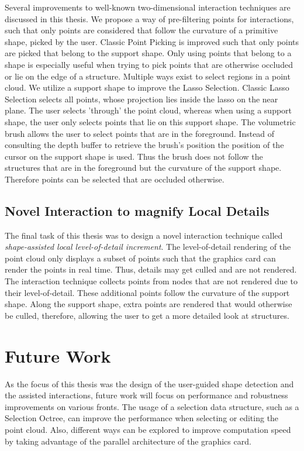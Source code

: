 Several improvements to well-known two-dimensional interaction techniques are discussed in this thesis. We propose a way of pre-filtering points for interactions, such that only points are considered that follow the curvature of a primitive shape, picked by the user. Classic Point Picking is improved such that only points are picked that belong to the support shape. Only using points that belong to a shape is especially useful when trying to pick points that are otherwise occluded or lie on the edge of a structure. Multiple ways exist to select regions in a point cloud. We utilize a support shape to improve the Lasso Selection. Classic Lasso Selection selects all points, whose projection lies inside the lasso on the near plane. The user selects 'through' the point cloud, whereas when using a support shape, the user only selects points that lie on this support shape. The volumetric brush allows the user to select points that are in the foreground. Instead of consulting the depth buffer to retrieve the brush's position the position of the cursor on the support shape is used. Thus the brush does not follow the structures that are in the foreground but the curvature of the support shape. Therefore points can be selected that are occluded otherwise. 


\subsection*{Novel Interaction to magnify Local Details}

The final task of this thesis was to design a novel interaction technique called \textit{shape-assisted local level-of-detail increment}. The level-of-detail rendering of the point cloud only displays a subset of points such that the graphics card can render the points in real time. Thus, details may get culled and are not rendered. The interaction technique collects points from nodes that are not rendered due to their level-of-detail. These additional points follow the curvature of the support shape. Along the support shape, extra points are rendered that would otherwise be culled, therefore, allowing the user to get a more detailed look at structures. 


\section{Future Work}

As the focus of this thesis was the design of the user-guided shape detection and the assisted interactions, future work will focus on performance and robustness improvements on various fronts. The usage of a selection data structure, such as a Selection Octree\cite{scheiblauer2011out}, can improve the performance when selecting or editing the point cloud. Also, different ways can be explored to improve computation speed by taking advantage of the parallel architecture of the graphics card. 
\\

